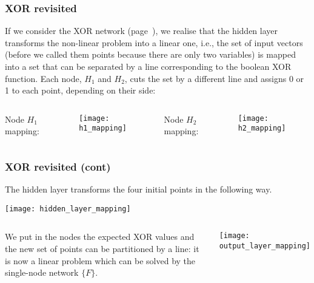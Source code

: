 %
\begin{frame}
\frametitle{XOR revisited}
\label{xor}

If we consider the XOR network (page~\pageref{xor_graph}), we realise
that the hidden layer transforms the non-linear problem into a linear
one, i.e., the set of input vectors (before we called them points
because there are only two variables) is mapped into a set that can be
separated by a line corresponding to the boolean XOR function. Each
node, \(H_1\) and \(H_2\), cuts the set by a different line and
assigns 0 or 1 to each point, depending on their side:

\bigskip

\begin{columns}[t]

    Node \(H_1\) mapping:
    \begin{center}
      \texttt{[image: h1\_mapping]}
    \end{center}

    Node \(H_2\) mapping:
    \begin{center}
      \texttt{[image: h2\_mapping]}
    \end{center}

\end{columns}

\end{frame}

%
\begin{frame}
\frametitle{XOR revisited (cont)}

The hidden layer transforms the four initial points in the following
way.
\begin{center}
  \texttt{[image: hidden\_layer\_mapping]}
\end{center}
\begin{columns}[c]

   We put in the nodes the expected XOR values
  and the new set of points can be partitioned by a line: it is now a
  linear problem which can be solved by the single-node network
  \(\lbrace{F}\rbrace\).

  \begin{center}
    \texttt{[image: output\_layer\_mapping]}
  \end{center}

\end{columns}

\end{frame}

